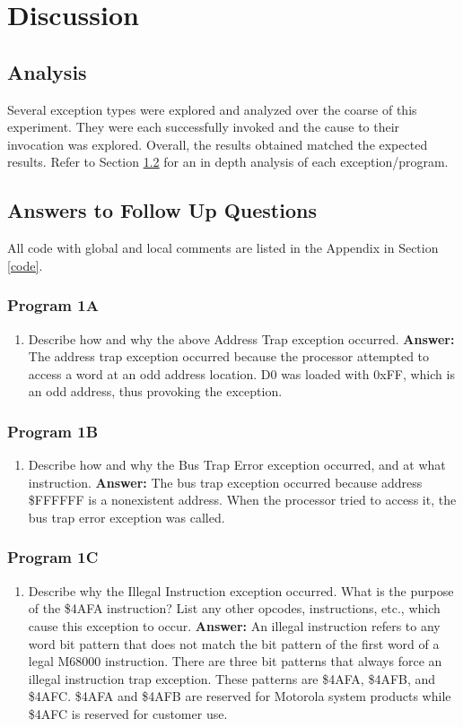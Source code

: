 \documentclass[12pt, twocolumn]{article}
\begin{document}
\section{Discussion}
\subsection{Analysis}
Several exception types were explored and analyzed over the coarse of this experiment. They were each successfully invoked and the cause to their invocation was explored. Overall, the results obtained matched the expected results. Refer to Section \ref{questions} for an in depth analysis of each exception/program.
\subsection{Answers to Follow Up Questions}\label{questions}
All code with global and local comments are listed in the Appendix in Section \ref{code}.
\subsubsection{Program 1A}
\begin{enumerate}
	\item Describe how and why the above Address Trap exception occurred.
	\subitem \hspace{-0.7cm}\textbf{Answer:} The address trap exception occurred because the processor attempted to access a word at an odd address location. D0 was loaded with 0xFF, which is an odd address, thus provoking the exception.
\end{enumerate}
\subsubsection{Program 1B}
\begin{enumerate}
	\item Describe how and why the Bus Trap Error exception occurred, and at what instruction.
	\subitem \hspace{-0.7cm}\textbf{Answer:} The bus trap exception occurred because address \$FFFFFF is a nonexistent address. When the processor tried to access it, the bus trap error exception was called.
\end{enumerate}
\subsubsection{Program 1C}
\begin{enumerate}
	\item Describe why the Illegal Instruction exception occurred. What is the purpose of the \$4AFA instruction? List any other opcodes, instructions, etc., which cause this exception to occur.
	\subitem \hspace{-0.7cm}\textbf{Answer:} An illegal instruction refers to any word bit pattern that does not match the bit pattern of the first word of a legal M68000 instruction. There are three bit patterns that always force an illegal instruction trap exception. These patterns are \$4AFA, \$4AFB, and \$4AFC. \$4AFA and \$4AFB are reserved for Motorola system products while \$4AFC is reserved for customer use.
\end{enumerate}
\end{document}
